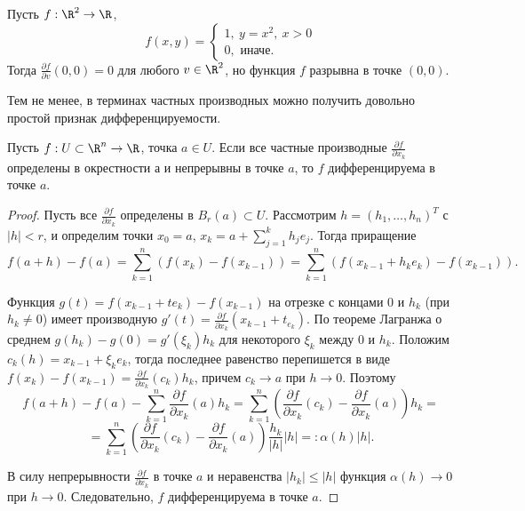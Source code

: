 \begin{example}
    Пусть $f: \R^{2} \to \R$,
    \[f(x, y) = \begin{cases}
        1, \ y = x^{2}, \ x > 0 \\
        0, \text{ иначе. }
    \end{cases}\]
    Тогда $\frac{\partial f}{\partial v}(0, 0) = 0$ для любого $v \in \R^{2}$, но функция $f$ разрывна в точке $(0, 0)$.

    Тем не менее, в терминах частных производных можно получить довольно простой признак дифференцируемости.
\end{example}

\begin{theorem}
    Пусть $f: U \subset \R^{n} \to \R$, точка $a \in U$. Если все частные производные $\frac{\partial f}{\partial x_{k}}$ определены в окрестности а и непрерывны в точке $a$, то $f$ дифференцируема в точке $a$.
\end{theorem}

\begin{proof}
    Пусть все $\frac{\partial f}{\partial x_{k}}$ определены в $B_{r}(a) \subset U$. Рассмотрим $h = (h_{1}, \ldots, h_{n})^{T}$ с $|h| < r$, и определим точки $x_{0} = a$, $x_{k} = a + \sum_{j = 1}^{k} h_{j}e_{j}$. Тогда приращение
    \[f(a + h) - f(a) = \sum_{k = 1}^{n}(f(x_{k}) - f(x_{k - 1})) = \sum_{k = 1}^{n}(f(x_{k - 1} + h_{k}e_{k}) - f(x_{k - 1})).\]

    Функция $g(t) = f(x_{k - 1} + te_{k}) - f(x_{k - 1})$ на отрезке с концами $0$ и $h_{k}$ (при $h_{k} \neq 0$) имеет производную $g'(t) = \frac{\partial f}{\partial x_{k}}(x_{k - 1} + t_{e_{k}})$. По теореме Лагранжа о среднем $g(h_{k}) - g(0) = g'(\xi_{k})h_{k}$ для некоторого $\xi_{k}$ между $0$ и $h_{k}$. Положим $c_{k}(h) = x_{k - 1} + \xi_{k}e_{k}$, тогда последнее равенство перепишется в виде $f(x_{k}) - f(x_{k - 1}) = \frac{\partial f}{\partial x_{k}}(c_{k})h_{k}$, причем $c_{k} \to a$ при $h \to 0$. Поэтому 
    \[f(a + h) - f(a) - \sum_{k = 1}^{n} \frac{\partial f}{\partial x_{k}}(a)h_{k} = \sum_{k = 1}^{n}\left(\frac{\partial f}{\partial x_{k}}(c_{k}) - \frac{\partial f}{\partial x_{k}}(a)\right)h_{k} =\]
    \[=\sum_{k = 1}^{n} \left(\frac{\partial f}{\partial x_{k}}(c_{k}) - \frac{\partial f}{\partial x_{k}}(a)\right)\frac{h_{k}}{|h|}|h| =: \alpha(h)|h|.\]

    В силу непрерывности $\frac{\partial f}{\partial x_{k}}$ в точке $a$ и неравенства $|h_{k}| \leq |h|$ функция $\alpha(h) \to 0$ при $h \to 0$. Следовательно, $f$ дифференцируема в точке $a$.
\end{proof}

